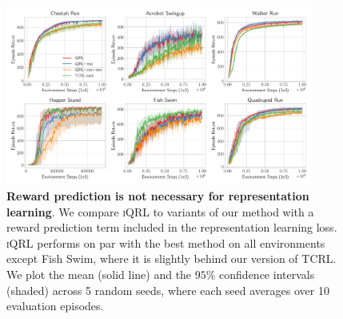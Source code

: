 \documentclass{article}
\theoremstyle{plain}
\theoremstyle{definition}
\theoremstyle{remark}
\newcommand{\our}{\textsc{iQRL}\xspace}
\begin{document}






\begin{figure}[ht]
\vskip 0.2in
\begin{center}
\centerline{\includegraphics[width=0.9\textwidth]{./figs/reward-ablation.pdf}}
\caption{\textbf{Reward prediction is not necessary for representation learning}. We compare \our to variants of our method with a reward prediction term included in the representation learning loss. \our performs on par with the best method on all environments except Fish Swim, where it is slightly behind our version of TCRL. We plot the mean (solid line) and the $95\%$ confidence intervals (shaded) across 5 random seeds, where each seed averages over 10 evaluation episodes.}
\label{fig:reward-ablation}
\end{center}
\vskip -0.2in
\end{figure}
\end{document}
